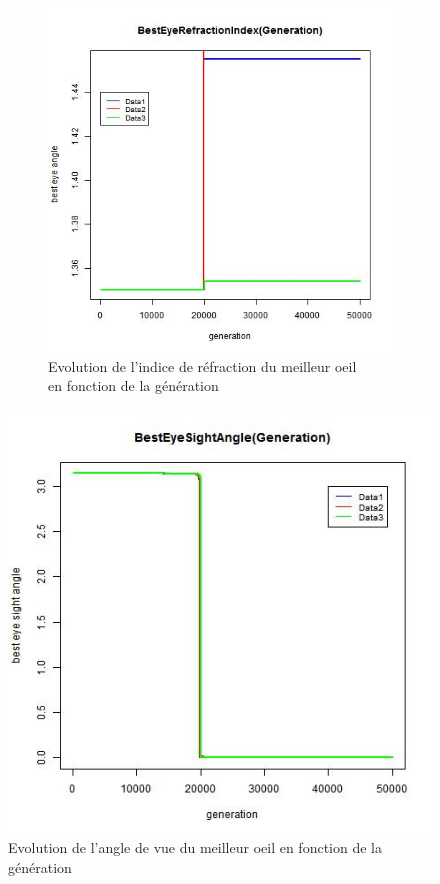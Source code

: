 \documentclass[a4paper,11pt]{article}
\begin{document}
\begin{figure}
\begin{subfigure}{.5\textwidth}
\includegraphics[width=1\linewidth]{best_eye_refraction_index.jpeg}
\caption{Evolution de l'indice de réfraction du meilleur oeil \\en fonction de la génération}
\label{fig:best_8}
\end{subfigure}
\caption{}
\label{fig:test}
\end{figure}

%

\begin{figure}[htbp]
\begin{center}
\includegraphics[width=.5\linewidth]{best_eye_sight_angle.jpeg}
\caption{Evolution de l'angle de vue du meilleur oeil en fonction de la génération}
\label{fig:best_9}
\end{center}
\end{figure}
\end{document}
